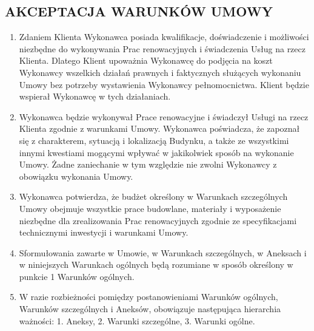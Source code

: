\begin{multicols}{2}
\subsection{AKCEPTACJA WARUNKÓW UMOWY}
\begin{enumerate}
	\item Zdaniem Klienta Wykonawca posiada kwalifikacje, doświadczenie i możliwości niezbędne do wykonywania Prac renowacyjnych i świadczenia Usług na rzecz Klienta. Dlatego Klient upoważnia Wykonawcę do podjęcia na koszt Wykonawcy wszelkich działań prawnych i faktycznych służących wykonaniu Umowy bez potrzeby wystawienia Wykonawcy pełnomocnictwa. Klient będzie wspierał Wykonawcę w tych działaniach.
	\item Wykonawca będzie wykonywał Prace renowacyjne i świadczył Usługi na rzecz Klienta zgodnie z warunkami Umowy. Wykonawca poświadcza, że zapoznał się z charakterem, sytuacją i lokalizacją Budynku, a także ze wszystkimi innymi kwestiami mogącymi wpływać w jakikolwiek sposób na wykonanie Umowy. Żadne zaniechanie w tym względzie nie zwolni Wykonawcy z obowiązku wykonania Umowy.
	\item Wykonawca potwierdza, że budżet określony w Warunkach szczególnych Umowy obejmuje wszystkie prace budowlane, materiały i wyposażenie niezbędne dla zrealizowania Prac renowacyjnych zgodnie ze specyfikacjami technicznymi inwestycji i warunkami Umowy.
	\item Sformułowania zawarte w Umowie, w Warunkach szczególnych, w Aneksach i w niniejszych Warunkach ogólnych będą rozumiane w sposób określony w punkcie 1 Warunków ogólnych.
	\item W razie rozbieżności pomiędzy postanowieniami Warunków ogólnych, Warunków szczególnych i Aneksów, obowiązuje następująca hierarchia ważności: 1. Aneksy, 2. Warunki szczególne, 3. Warunki ogólne.
\end{enumerate}


\end{multicols}
